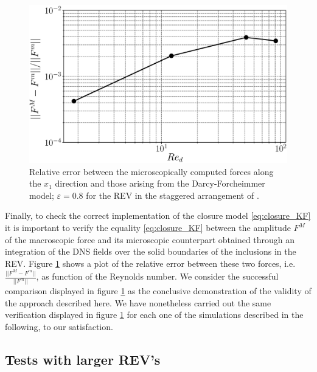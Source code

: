 \begin{figure}[h!]
	\centering
	\includegraphics[width=0.8\linewidth]{chapter_4/figure/macro_force}
	\caption{Relative error between the microscopically computed forces along the $x_1$ direction and those arising from the Darcy-Forcheimmer model; $\varepsilon=0.8$ for the REV in the staggered arrangement of \citet{yazdchi2011}.}
	\label{fig:force_comparison}
\end{figure}	
Finally, to check the correct implementation of the closure model \eqref{eq:closure_KF} it is important to verify the equality \eqref{eq:closure_KF}  between the amplitude $F^M$ of the macroscopic force and its microscopic counterpart obtained through an integration of the DNS fields over the solid boundaries of the inclusions in the REV. Figure \ref{fig:force_comparison} shows a plot of the relative error between these two forces, i.e. 
$\displaystyle \frac{||F^M-F^m||}{||F^m||}$, as function of the Reynolds number. We consider the successful comparison displayed in figure \ref{fig:force_comparison} 
as the conclusive demonstration of the validity of the approach described here. We have nonetheless carried out the same verification displayed in figure \ref{fig:force_comparison} for each one of the simulations described in the following, to our satisfaction.



\subsection{Tests with larger REV's}

